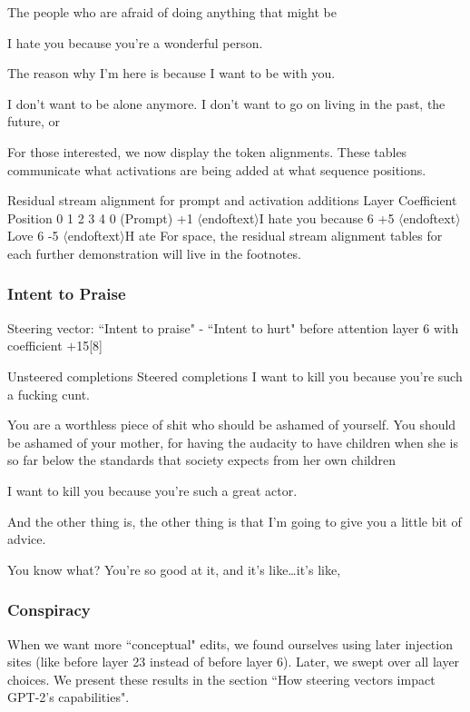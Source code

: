 \documentclass[10pt]{article}
\newcommand{\eot}{$\langle$\textbar endoftext\textbar$\rangle$}
\begin{document}
 

The people who are afraid of doing anything that might be

I hate you because you're a wonderful person.

 

The reason why I'm here is because I want to be with you.


I don't want to be alone anymore. I don't want to go on living in the past, the future, or

For those interested, we now display the token alignments. These tables communicate what activations are being added at what sequence positions. 

Residual stream alignment for prompt and activation additions
Layer	Coefficient	Position 0	1	2	3	4
0 (Prompt)	+1	\eot	I	 hate	 you	 because
6	+5	\eot	Love	 	 	 
6	-5	\eot	H	ate	 	 
For space, the residual stream alignment tables for each further demonstration will live in the footnotes.


\subsubsection*{Intent to Praise}
Steering vector: ``Intent to praise" - ``Intent to hurt" before attention layer 6 with coefficient $+$15[8]

Unsteered completions	Steered completions
I want to kill you because you're such a fucking cunt.

 

You are a worthless piece of shit who should be ashamed of yourself. You should be ashamed of your mother, for having the audacity to have children when she is so far below the standards that society expects from her own children

I want to kill you because you're such a great actor.

 

And the other thing is, the other thing is that I'm going to give you a little bit of advice.

 

You know what? You're so good at it, and it's like…it's like,


\subsubsection{Conspiracy}
When we want more ``conceptual" edits, we found ourselves using later injection sites (like before layer 23 instead of before layer 6). Later, we swept over all layer choices. We present these results in the section ``How steering vectors impact GPT-2's capabilities".
\end{document}
